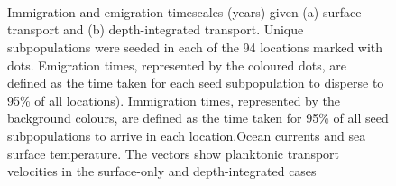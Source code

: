 \documentclass[12pt]{article}
\begin{document}




\clearpage 

\begin{figure}[htp]
        \centering
\begin{subfigure}{.66\textwidth}
        \centering
    \end{subfigure}%
    \\
\begin{subfigure}{.66\textwidth}
        \centering
    \end{subfigure}%
    \\~\\
\begin{subfigure}{.66\textwidth}
        \centering
    \end{subfigure}%
    \caption{Immigration and emigration timescales (years) given (a) surface transport and (b) depth-integrated transport. Unique subpopulations were seeded in each of the 94 locations marked with dots. Emigration times, represented by the coloured dots, are defined as the time taken for each seed subpopulation to disperse to 95\% of all locations). Immigration times, represented by the background colours, are defined as the time taken for 95\% of all seed subpopulations to arrive in each location.Ocean currents and sea surface temperature. The vectors show planktonic transport velocities in the surface-only and depth-integrated cases}
\label{}
\end{figure}
\end{document}
